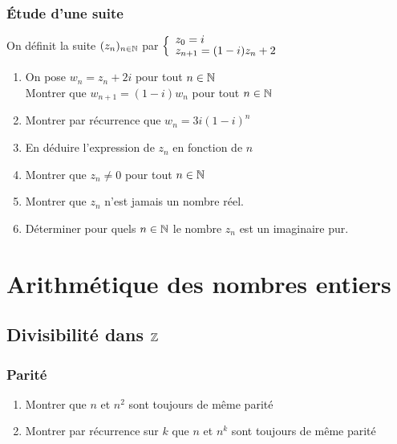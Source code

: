 \documentclass[oneside,12pt]{book}          %
\begin{document}
\subsection{Étude d'une suite}

On définit la suite $(z_n)_{{n\in\mathbb N}}$ par $\defsuitez{z_0=i}{(1-i)z_n+2}$
\begin{enumerate}
    \item On pose $w_n=z_n+2i$ pour tout ${n\in\mathbb N}$ \\
    Montrer que $w_{n+1}=(1-i)w_n$ pour tout ${n\in\mathbb N}$
    \item Montrer par récurrence que $w_n=3i(1-i)^n$
    \item En déduire l'expression de $z_n$ en fonction de $n$
    \item Montrer que $z_n\neq0$ pour tout ${n\in\mathbb N}$
    \item Montrer que $z_n$ n'est jamais un nombre réel.
    \item Déterminer pour quels ${n\in\mathbb N}$ le nombre $z_n$ est un imaginaire pur.
\end{enumerate}



\chapter{Arithmétique des nombres entiers}
\newpage

\section{Divisibilité dans ${\mathbb Z}$}

\subsection{Parité}
\begin{enumerate}
    \item Montrer que $n$ et $n^2$ sont toujours de même parité
    \item Montrer par récurrence sur $k$ que $n$ et $n^k$ sont toujours de même parité
\end{enumerate}
\end{document}
